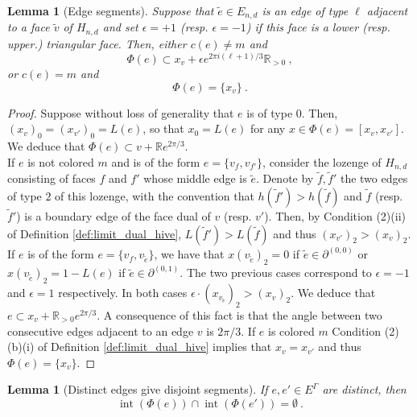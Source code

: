 \documentclass[11pt,a4paper]{amsart}
\DeclareMathOperator{\interior}{int}
\numberwithin{equation}{section}
\newtheorem{lemma}[theorem]{Lemma}
\theoremstyle{definition}
\begin{document}
\begin{lemma}[Edge segments]
    \label{lem:hive_honey_1}
    Suppose that $\tilde{e} \in E_{n, d}$ is an edge of type 
    $\ell$ adjacent to a face $\tilde{v}$ of $H_{n,d}$ 
    and set $\epsilon=+1$ (resp. $\epsilon=-1$) if this 
    face is  a lower (resp. upper.) triangular face.  
    Then, either $c(e) \neq m$ and
    $$\Phi(e)\subset x_v + \epsilon e^{2 \pi i(\ell+1)/3} \mathbb{R}_{>0} \ ,$$
    or $c(e)=m$ and 
    $$\Phi(e)=\{x_v\} \ .$$
\end{lemma}

\begin{proof}
    Suppose without loss of generality that $e$ is of type $0$. 
    Then, $(x_v)_0=(x_{v'})_0=L(e)$, so that $x_0=L(e)$ for any 
    $x\in \Phi(e)=[x_v,x_{v'}]$. 
    We deduce that $\Phi(e)\subset v+\mathbb{R}e^{2\pi/3}$. 
    \\
    If $e$ is not colored $m$ 
    and is of the form $e = \{v_f, v_{f'}\}$, 
    consider the lozenge 
    of $H_{n,d}$  consisting of faces $f$ and $f'$ 
    whose middle edge is $\tilde{e}$. 
    Denote by $\tilde{f},\tilde{f}'$ the two edges of type $2$ of 
    this lozenge, with the convention that $h(\tilde{f}')>h(\tilde{f})$ 
    and $\tilde{f}$ (resp. $\tilde{f}'$) is a boundary edge of the 
    face dual of $v$ (resp. $v'$). 
    Then, by Condition (2)(ii) of Definition \ref{def:limit_dual_hive}, 
    $L(\tilde{f}')>L(\tilde{f})$ and thus $(x_{v'})_{2}>(x_v)_2$. 
    If $e$ is of the form $e = \{v_f, v_{\tilde{e}}\}$, 
    we have that $x(v_{\tilde{e}})_2 = 0$ if $\tilde{e} \in \partial^{(0, 0)}$ 
    or $x(v_{\tilde{e}})_2 = 1 - L(e)$ if $\tilde{e} \in \partial^{(0, 1)}$. 
    The two previous cases correspond to $\epsilon = -1$ and 
     $\epsilon = 1$ respectively. In both cases $\epsilon \cdot (x_{v_{\tilde{e}}})_{2} 
     > (x_v)_2$. We deduce that $e\subset x_v+\mathbb{R}_{>0}e^{2\pi/3}$. 
    A consequence of this fact is that the angle between two consecutive 
    edges adjacent to an edge $v$ is $2\pi/3$. 
    If $e$ is colored $m$ Condition (2)(b)(i) of Definition 
    \ref{def:limit_dual_hive} implies that $x_{v}=x_{v'}$ 
    and thus $\Phi(e)=\{x_v\}$.
\end{proof}


\begin{lemma}[Distinct edges give disjoint segments]
    \label{lem:hive_honey_non_crossing}
    If $e,e'\in E^\Gamma$ are distinct, then 
    $$\interior(\Phi(e))\cap \interior(\Phi(e'))=\emptyset \ .$$
\end{lemma}
\end{document}
